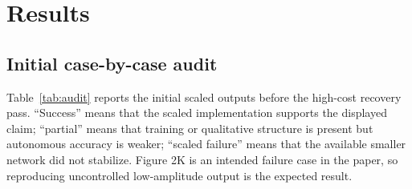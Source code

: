 \section{Results}

\subsection{Initial case-by-case audit}
Table~\ref{tab:audit} reports the initial scaled outputs before the high-cost recovery pass. ``Success'' means that the scaled implementation supports the displayed claim; ``partial'' means that training or qualitative structure is present but autonomous accuracy is weaker; ``scaled failure'' means that the available smaller network did not stabilize. Figure 2K is an intended failure case in the paper, so reproducing uncontrolled low-amplitude output is the expected result.

